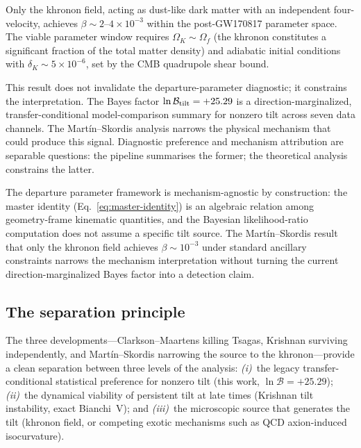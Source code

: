 Only the khronon field, acting as dust-like dark matter
with an independent four-velocity, achieves
$\beta \sim 2$--$4 \times 10^{-3}$ within the
post-GW170817 parameter space.  The viable parameter
window requires $\Omega_K \sim \Omega_f$ (the khronon
constitutes a significant fraction of the total matter
density) and adiabatic initial conditions with
$\delta_K \sim 5 \times 10^{-6}$, set by the CMB
quadrupole shear bound.

This result does not invalidate the departure-parameter
diagnostic; it constrains the interpretation.  The Bayes
factor $\ln \mathcal{B}_{\rm tilt} = +25.29$ is a
direction-marginalized, transfer-conditional model-comparison
summary for nonzero tilt across seven data channels.  The
Mart{\'i}n--Skordis analysis narrows the physical mechanism
that could produce this signal.  Diagnostic preference and
mechanism attribution are separable questions: the pipeline
summarises the former; the theoretical analysis constrains
the latter.

\begin{remark}
\label{rem:diagnostic-preference-mechanism}
The departure parameter framework is mechanism-agnostic
by construction: the master identity
(Eq.~\ref{eq:master-identity}) is an algebraic
relation among geometry-frame kinematic quantities, and
the Bayesian likelihood-ratio computation does not assume a
specific tilt source.  The Mart{\'i}n--Skordis result
that only the khronon field achieves $\beta \sim
10^{-3}$ under standard ancillary constraints narrows
the mechanism interpretation without turning the current
direction-marginalized Bayes factor into a detection claim.
\end{remark}


\subsection{The separation principle}
\label{sec:disc-separation}

The three developments---Clarkson--Maartens killing Tsagas,
Krishnan surviving independently, and Mart{\'i}n--Skordis
narrowing the source to the khronon---provide a clean
separation between three levels of the analysis:
\emph{(i)}~the legacy transfer-conditional statistical preference
for nonzero tilt
(this work, $\ln \mathcal{B} = +25.29$);
\emph{(ii)}~the dynamical viability of persistent tilt at
late times (Krishnan tilt instability, exact Bianchi~V);
and \emph{(iii)}~the microscopic source that generates the
tilt (khronon field, or competing exotic mechanisms such
as QCD axion-induced isocurvature).

